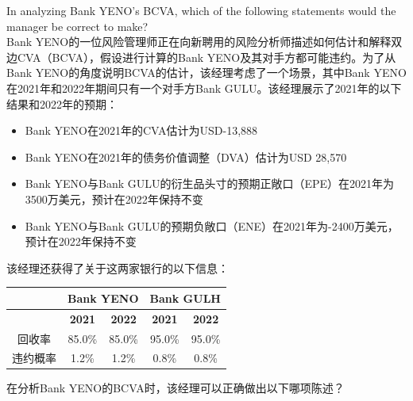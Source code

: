 \documentclass{article}
\newcounter{question} %
\begin{document}
\begin{question}
    In analyzing Bank YENO's BCVA, which of the following statements would the manager be correct to make?
    \\    Bank YENO的一位风险管理师正在向新聘用的风险分析师描述如何估计和解释双边CVA（BCVA），假设进行计算的Bank YENO及其对手方都可能违约。为了从Bank YENO的角度说明BCVA的估计，该经理考虑了一个场景，其中Bank YENO在2021年和2022年期间只有一个对手方Bank GULU。该经理展示了2021年的以下结果和2022年的预期：
    \begin{itemize}
        \item Bank YENO在2021年的CVA估计为USD-13,888
        \item Bank YENO在2021年的债务价值调整（DVA）估计为USD 28,570
        \item Bank YENO与Bank GULU的衍生品头寸的预期正敞口（EPE）在2021年为3500万美元，预计在2022年保持不变
        \item Bank YENO与Bank GULU的预期负敞口（ENE）在2021年为-2400万美元，预计在2022年保持不变
    \end{itemize}

    该经理还获得了关于这两家银行的以下信息：
    \begin{table}[H]
        \centering
        \renewcommand{\arraystretch}{1.2}
        \begin{tabular}{|c|c|c|c|c|}
            \hline
            & \multicolumn{2}{c|}{\textbf{Bank YENO}} & \multicolumn{2}{c|}{\textbf{Bank GULH}} \\
            \hline
            & \textbf{2021} & \textbf{2022} & \textbf{2021} & \textbf{2022} \\
            \hline
            回收率 & 85.0\% & 85.0\% & 95.0\% & 95.0\% \\
            \hline
            违约概率 & 1.2\% & 1.2\% & 0.8\% & 0.8\% \\
            \hline
        \end{tabular}
    \end{table}

    在分析Bank YENO的BCVA时，该经理可以正确做出以下哪项陈述？
\end{question}
\end{document}
